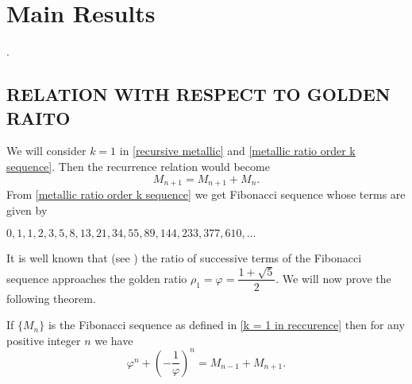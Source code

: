 \documentclass{rmutt-seminar}
\begin{document}
\section{Main Results}
.
\begin{center}	
\subsection*{RELATION WITH RESPECT TO GOLDEN RAITO}
\end{center}
We will consider $ k = 1 $ in \eqref{recursive metallic} and \eqref{metallic ratio order k sequence}. Then the recurrence relation would become 
\begin{equation}\label{k = 1 in reccurence}
	 M_{n+1} = M_{n+1} + M_n.
\end{equation}  
From \eqref{metallic ratio order k sequence} we get Fibonacci sequence whose terms are given by 
\begin{center}
	$0,1,1,2,3,5,8,13,21,34,55,89,144,233,377,610,\ldots $ 
\end{center}

It is well known that (see \cite{R20}) the ratio of successive terms of the Fibonacci sequence approaches the golden ratio
$ \rho_{1} = \varphi = \dfrac{1+\sqrt{5}}{2}$. We will now prove the following theorem.
\begin{theorem}\label{golden ratio theorem}
\textnormal{If} $\bigl\{ M_n \bigr\}$ \textnormal{is the Fibonacci sequence as defined in \eqref{k = 1 in reccurence} then for any positive integer} $ n $ \textnormal{we have} 
\begin{equation}\label{golden ratio recursive}
	\varphi^n + \left(-\frac{1}{\varphi}\right)^n = M_{n-1} + M_{n+1}.  
\end{equation}
\end{theorem}
\end{document}

